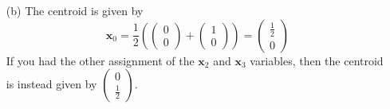 \documentclass[11pt,a4paper]{scrartcl}
\begin{document}
\begin{enumerate}
\begin{enumerate}
    \item[(b)] The centroid is given by 
    \[
        \mathbf{x}_0= \frac12 \left(
        \begin{pmatrix}
        0\\0
        \end{pmatrix}
        + 
                \begin{pmatrix}
        1\\0
        \end{pmatrix} \right)= 
        \begin{pmatrix}
        \frac12\\0
        \end{pmatrix}        
    \]
    If you had the other assignment of the $\mathbf{x}_2$ and $\mathbf{x}_3$ variables, then the centroid is instead given by $\begin{pmatrix}
        0\\\frac12
    \end{pmatrix}$.


\end{enumerate}
\end{enumerate}
\end{document}
